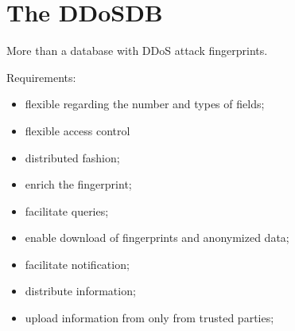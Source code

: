 \section{The DDoSDB}

More than a database with DDoS attack fingerprints.


Requirements:
\begin{itemize}
	\item flexible regarding the number and types of fields; 
	\item flexible access control
	\item distributed fashion;
	\item enrich the fingerprint;
	\item facilitate queries;
	\item enable download of fingerprints and anonymized data;
	\item facilitate notification;
	\item distribute information;
	\item upload information from only from trusted parties;
\end{itemize}